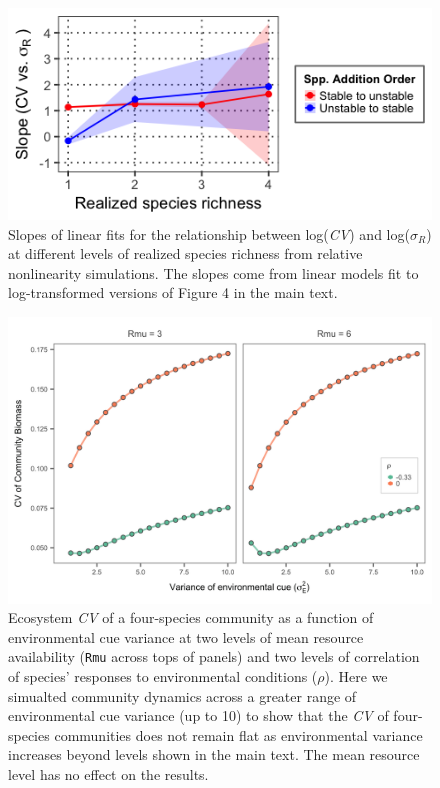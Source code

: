 \documentclass[11pt,]{article}
\begin{document}
\newpage{}

\begin{figure}[!ht]
  \centering
      \includegraphics[width=5in]{./components/relative_nonlinearity_div+envar_loglog_slopes.png}
  \caption{Slopes of linear fits for the relationship between log(\emph{CV}) and log($\sigma_R$) at different levels of realized species richness from relative nonlinearity simulations. The slopes come from linear models fit to log-transformed versions of Figure 4 in the main text.}
\end{figure}

\newpage{}

\begin{figure}[!ht]
  \centering
      \includegraphics[width=5in]{./components/SI_storage_effect_two_rmus_fourSpeciesOnly.png}
  \caption{Ecosystem \emph{CV} of a four-species community as a function of environmental cue variance at two levels of mean resource availability (\texttt{Rmu} across tops of panels) and two levels of correlation of species' responses to environmental conditions ($\rho$). Here we simualted community dynamics across a greater range of environmental cue variance (up to 10) to show that the \emph{CV} of four-species communities does not remain flat as environmental variance increases beyond levels shown in the main text. The mean resource level has no effect on the results.}
\end{figure}
\end{document}
